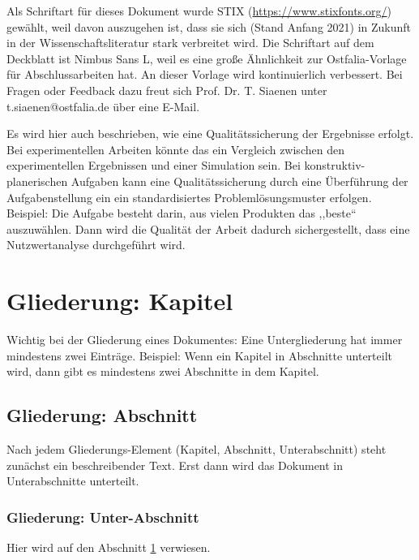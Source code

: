Als Schriftart für dieses Dokument wurde STIX (\url{https://www.stixfonts.org/})
gewählt, weil davon auszugehen ist, dass sie sich (Stand Anfang 2021)
in Zukunft in der Wissenschaftsliteratur stark verbreitet wird. Die
Schriftart auf dem Deckblatt ist Nimbus Sans L, weil es eine große
Ähnlichkeit zur Ostfalia-Vorlage für Abschlussarbeiten hat. An dieser
Vorlage wird kontinuierlich verbessert. Bei Fragen oder Feedback dazu
freut sich Prof. Dr. T. Siaenen unter t.siaenen@ostfalia.de über eine
E-Mail.

Es wird hier auch beschrieben, wie eine Qualitätssicherung der Ergebnisse
erfolgt. Bei experimentellen Arbeiten könnte das ein Vergleich zwischen
den experimentellen Ergebnissen und einer Simulation sein. Bei konstruktiv-planerischen
Aufgaben kann eine Qualitätssicherung durch eine Überführung der Aufgabenstellung
ein ein standardisiertes Problemlösungsmuster erfolgen. Beispiel:
Die Aufgabe besteht darin, aus vielen Produkten das ,,beste`` auszuwählen.
Dann wird die Qualität der Arbeit dadurch sichergestellt, dass eine
Nutzwertanalyse durchgeführt wird.

\chapter{Gliederung: Kapitel}

\label{chap:markeeineskapitels}Wichtig bei der Gliederung eines Dokumentes:
Eine Untergliederung hat immer mindestens zwei Einträge. Beispiel:
Wenn ein Kapitel in Abschnitte unterteilt wird, dann gibt es mindestens
zwei Abschnitte in dem Kapitel.

\section{Gliederung: Abschnitt}

Nach jedem Gliederungs-Element (Kapitel, Abschnitt, Unterabschnitt)
steht zunächst ein beschreibender Text. Erst dann wird das Dokument
in Unterabschnitte unterteilt.

\subsection{Gliederung: Unter-Abschnitt}

Hier wird auf den Abschnitt \ref{chap:markeeineskapitels} verwiesen.

